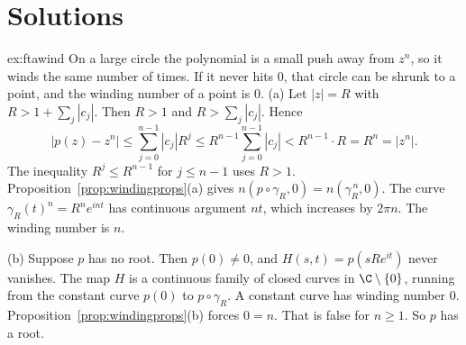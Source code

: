 \section{Solutions}

\begin{solution}{ex:ftawind}
\idea On a large circle the polynomial is a small push away from $z^n$, so it winds the same number of times. If it never hits $0$, that circle can be shrunk to a point, and the winding number of a point is $0$.
\writeup (a) Let $|z|=R$ with $R>1+\sum_j|c_j|$. Then $R>1$ and $R>\sum_j|c_j|$. Hence
\[
|p(z)-z^n|\le\sum_{j=0}^{n-1}|c_j|R^j\le R^{n-1}\sum_{j=0}^{n-1}|c_j|<R^{n-1}\cdot R=R^n=|z^n|.
\]
The inequality $R^j\le R^{n-1}$ for $j\le n-1$ uses $R>1$. Proposition~\ref{prop:windingprops}(a) gives $n(p\circ\gamma_R,0)=n(\gamma_R^{\,n},0)$. The curve $\gamma_R(t)^n=R^ne^{int}$ has continuous argument $nt$, which increases by $2\pi n$. The winding number is $n$.

(b) Suppose $p$ has no root. Then $p(0)\ne0$, and $H(s,t)=p(sRe^{it})$ never vanishes. The map $H$ is a continuous family of closed curves in $\C\setminus\{0\}$, running from the constant curve $p(0)$ to $p\circ\gamma_R$. A constant curve has winding number $0$. Proposition~\ref{prop:windingprops}(b) forces $0=n$. That is false for $n\ge1$. So $p$ has a root.
\end{solution}

